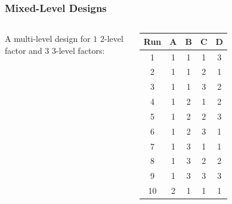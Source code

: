 \documentclass[10pt, compress, aspectratio=169, xcolor={table,usenames,dvipsnames}]{beamer}
\begin{document}
\begin{frame}
    \frametitle{Mixed-Level Designs}
    \begin{columns}[c]

            \vspace{.1cm}

            A \alert{multi-level} design for $1$ \alert{$2$-level factor}
            and $3$ \alert{$3$-level factors}:

            \vspace{-.3cm}

            \begin{table}[]
                \scriptsize
                \centering
                \begin{tabular}{@{}ccccc@{}}
                    \toprule
                    Run & A & B & C & D \\ \midrule
                    \cellcolor{gray!18}1 & \cellcolor{green!25}1 & \cellcolor{green!25}1 & \cellcolor{green!25}1 & \cellcolor{red!25}3 \\
                    \cellcolor{gray!18}2 & \cellcolor{green!25}1 & \cellcolor{green!25}1 & \cellcolor{cyan!25}2 & \cellcolor{green!25}1 \\
                    \cellcolor{gray!18}3 & \cellcolor{green!25}1 & \cellcolor{green!25}1 & \cellcolor{red!25}3 & \cellcolor{cyan!25}2 \\
                    \cellcolor{gray!18}4 & \cellcolor{green!25}1 & \cellcolor{cyan!25}2 & \cellcolor{green!25}1 & \cellcolor{cyan!25}2 \\
                    \cellcolor{gray!18}5 & \cellcolor{green!25}1 & \cellcolor{cyan!25}2 & \cellcolor{cyan!25}2 & \cellcolor{red!25}3 \\
                    \cellcolor{gray!18}6 & \cellcolor{green!25}1 & \cellcolor{cyan!25}2 & \cellcolor{red!25}3 & \cellcolor{green!25}1 \\
                    \cellcolor{gray!18}7 & \cellcolor{green!25}1 & \cellcolor{red!25}3 & \cellcolor{green!25}1 & \cellcolor{green!25}1 \\
                    \cellcolor{gray!18}8 & \cellcolor{green!25}1 & \cellcolor{red!25}3 & \cellcolor{cyan!25}2 & \cellcolor{cyan!25}2 \\
                    \cellcolor{gray!18}9 & \cellcolor{green!25}1 & \cellcolor{red!25}3 & \cellcolor{red!25}3 & \cellcolor{red!25}3 \\
                    \cellcolor{gray!18}10 & \cellcolor{cyan!25}2 & \cellcolor{green!25}1 & \cellcolor{green!25}1 & \cellcolor{green!25}1 \\

\end{tabular}
\end{table}
\end{columns}
\end{frame}
\end{document}
